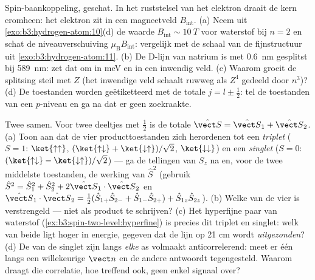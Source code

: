 \begin{exercise}[$\star\star\star$]\label{exo:b3:spin-two-level:10}
Spin-baankoppeling, geschat. In het ruststelsel van het elektron draait de
kern eromheen: het elektron zit in een magneetveld $B_{\text
{int}}$. (a)
Neem uit \cref{exo:b3:hydrogen-atom:10}(d) de waarde $B_{\text{int}} \sim \qty{10}{T}$ voor waterstof bij $n = 2$ en schat de niveauverschuiving
$\mu_{\text{B}}B_{\text{int}}$: vergelijk met de schaal van de
fijnstructuur uit \cref{exo:b3:hydrogen-atom:11}. (b) De D-lijn van
natrium is met \qty{0.6}{nm} gesplitst bij \qty{589}{nm}: zet dat om in
meV en in een inwendig veld. (c) Waarom groeit de splitsing steil met $Z$
(het inwendige veld schaalt ruwweg als $Z^4$ gedeeld door $n^3$)? (d) De
toestanden worden geëtiketteerd met de totale $j = l \pm \tfrac12$: tel de
toestanden van een $p$-niveau en ga na dat er geen zoekraakte.
\end{exercise}

\begin{exercise}[$\star\star\star$]\label{exo:b3:spin-two-level:11}
Twee  samen. Voor twee deeltjes met  $\tfrac12$ is de totale 
$\hat{\vect S} = \hat{\vect S}_1 + \hat{\vect S}_2$. (a) Toon aan dat de
vier producttoestanden zich herordenen tot een \emph{triplet} ($S = 1$:
$\ket{\uparrow\uparrow}$, $(\ket{\uparrow\downarrow} +
\ket{\downarrow\uparrow})/\sqrt2$, $\ket{\downarrow\downarrow}$) en een
\emph{singlet} ($S = 0$: $(\ket{\uparrow\downarrow} -
\ket{\downarrow\uparrow})/\sqrt2$) --- ga de tellingen van $S_z$ na en,
voor de twee middelste toestanden, de werking van $\hat S^2$ (gebruik
$\hat
S^2 = \hat S_1^2 + \hat S_2^2 + 2\hat{\vect S}_1\cdot\hat{\vect
S}_2$ en $\hat{\vect S}_1\cdot\hat{\vect S}_2 = \tfrac12(\hat
S_{1+}\hat S_{2-} + \hat S_{1-}\hat S_{2+}) + \hat S_{1z}\hat
S_{2z}$). (b) Welke van de vier is verstrengeld --- niet als product te
schrijven? (c) Het hyperfijne paar van waterstof
(\cref{ex:b3:spin-two-level:hyperfine}) is precies dit triplet en
singlet: welk van beide ligt hoger in energie, gegeven dat de lijn op
21 cm wordt \emph{uitgezonden}? (d) De  van de singlet zijn langs
\emph{elke} as volmaakt anticorrelerend: meet er één langs een
willekeurige $\vect n$ en de andere antwoordt tegengesteld. Waarom draagt
die correlatie, hoe treffend ook, geen enkel signaal over?
\end{exercise}

